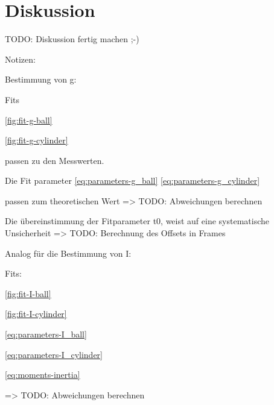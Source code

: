 \section{Diskussion}
\label{sec:Diskussion}


TODO: Diskussion fertig machen ;-)

Notizen:

Bestimmung von g: 

Fits

\autoref{fig:fit-g-ball}

\autoref{fig:fit-g-cylinder}

passen zu den Messwerten.


Die Fit parameter 
\eqref{eq:parameters-g_ball}
\eqref{eq:parameters-g_cylinder}

passen zum theoretischen Wert  
=> TODO: Abweichungen berechnen

Die übereinstimmung der Fitparameter t0, weist auf eine systematische Unsicherheit
=> TODO: Berechnung des Offsets in Frames

Analog für die Bestimmung von I:

Fits:

\autoref{fig:fit-I-ball}

\autoref{fig:fit-I-cylinder}

\eqref{eq:parameters-I_ball}

\eqref{eq:parameters-I_cylinder}

\eqref{eq:moments-inertia}

=> TODO: Abweichungen berechnen


